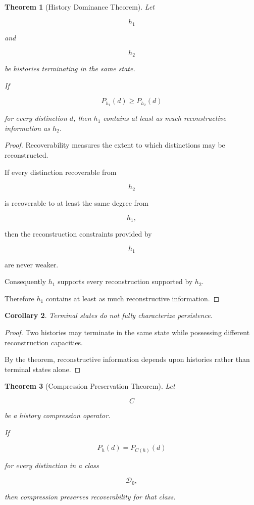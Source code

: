 \documentclass[12pt,oneside]{article}
\newtheorem{theorem}{Theorem}[section] \newtheorem{lemma}[theorem]{Lemma} \newtheorem{proposition}[theorem]{Proposition} \newtheorem{corollary}[theorem]{Corollary}
\theoremstyle{definition}
\begin{document}
\begin{theorem}[History Dominance Theorem]

Let

\[
h_1
\]

and

\[
h_2
\]

be histories terminating in the same state.

If

\[
P_{h_1}(d)
\ge
P_{h_2}(d)
\]

for every distinction \(d\), then \(h_1\) contains at least as much reconstructive information as \(h_2\).

\end{theorem}

\begin{proof}

Recoverability measures the extent to which distinctions may be reconstructed.

If every distinction recoverable from

\[
h_2
\]

is recoverable to at least the same degree from

\[
h_1,
\]

then the reconstruction constraints provided by

\[
h_1
\]

are never weaker.

Consequently \(h_1\) supports every reconstruction supported by \(h_2\).

Therefore \(h_1\) contains at least as much reconstructive information.

\end{proof}

\begin{corollary}

Terminal states do not fully characterize persistence.

\end{corollary}

\begin{proof}

Two histories may terminate in the same state while possessing different reconstruction capacities.

By the theorem, reconstructive information depends upon histories rather than terminal states alone.

\end{proof}

\begin{theorem}[Compression Preservation Theorem]

Let

\[
C
\]

be a history compression operator.

If

\[
P_h(d)
=
P_{C(h)}(d)
\]

for every distinction in a class

\[
\mathcal D_0,
\]

then compression preserves recoverability for that class.

\end{theorem}
\end{document}
